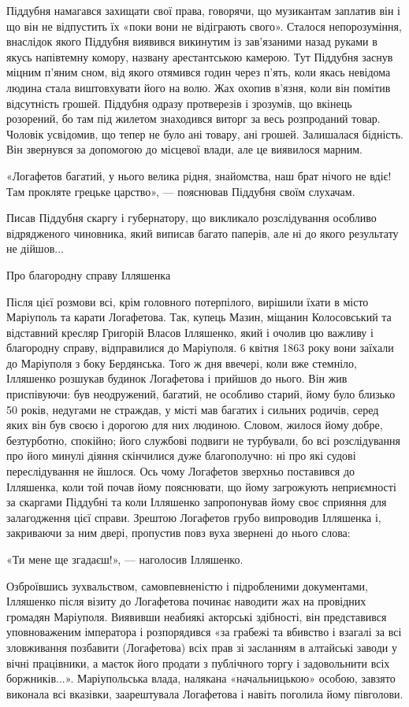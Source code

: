 Піддубня намагався захищати свої права, говорячи, що музикантам заплатив він і
що він не відпустить їх «поки вони не відіграють свого». Сталося непорозуміння,
внаслідок якого Піддубня виявився викинутим із зав'язаними назад руками в якусь
напівтемну комору, названу арестантською камерою. Тут Піддубня заснув міцним
п'яним сном, від якого отямився годин через п'ять, коли якась невідома людина
стала виштовхувати його на волю. Жах охопив в'язня, коли він помітив
відсутність грошей. Піддубня одразу протверезів і зрозумів, що вкінець
розорений, бо там під жилетом знаходився виторг за весь розпроданий товар.
Чоловік усвідомив, що тепер не було ані товару, ані грошей. Залишалася
бідність. Він звернувся за допомогою до місцевої влади, але це виявилося
марним.

«Логафетов багатий, у нього велика рідня, знайомства, наш брат нічого не вдіє!
Там прокляте грецьке царство», — пояснював Піддубня своїм слухачам.

Писав Піддубня скаргу і губернатору, що викликало розслідування особливо
відрядженого чиновника, який виписав багато паперів, але ні до якого результату
не дійшов...

Про благородну справу Ілляшенка

Після цієї розмови всі, крім головного потерпілого, вирішили їхати в місто
Маріуполь та карати Логафетова. Так, купець Мазин, міщанин Колосовський та
відставний кресляр Григорій Власов Ілляшенко, який і очолив цю важливу і
благородну справу, відправилися до Маріуполя. 6 квітня 1863 року вони заїхали
до Маріуполя з боку Бердянська. Того ж дня ввечері, коли вже стемніло,
Ілляшенко розшукав будинок Логафетова і прийшов до нього. Він жив приспівуючи:
був неодружений, багатий, не особливо старий, йому було близько 50 років,
недугами не страждав, у місті мав багатих і сильних родичів, серед яких він був
своєю і дорогою для них людиною. Словом, жилося йому добре, безтурботно,
спокійно; його службові подвиги не турбували, бо всі розслідування про його
минулі діяння скінчилися дуже благополучно: ні про які судові переслідування не
йшлося. Ось чому Логафетов зверхньо поставився до Ілляшенка, коли той почав
йому пояснювати, що йому загрожують неприємності за скаргами Піддубні та коли
Ілляшенко запропонував йому своє сприяння для залагодження цієї справи. Зрештою
Логафетов грубо випроводив Ілляшенка і, закриваючи за ним двері, пропустив повз
вуха звернені до нього слова:

«Ти мене ще згадаєш!», — наголосив Ілляшенко.

Озброївшись зухвальством, самовпевненістю і підробленими документами, Ілляшенко
після візиту до Логафетова починає наводити жах на провідних громадян
Маріуполя. Виявивши неабиякі акторські здібності, він представився
уповноваженим імператора і розпорядився «за грабежі та вбивство і взагалі за
всі зловживання позбавити (Логафетова) всіх прав зі засланням в алтайські
заводи у вічні працівники, а маєток його продати з публічного торгу і
задовольнити всіх боржників...». Маріупольська влада, налякана «начальницькою»
особою, завзято виконала всі вказівки, заарештувала Логафетова і навіть
поголила йому півголови. 


